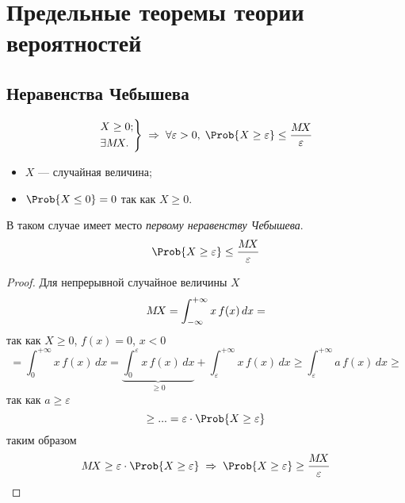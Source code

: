 
\section{Предельные теоремы теории вероятностей}


\subsection{Неравенства Чебышева}

\begin{thm}
	\[
		\left. \begin{aligned}
			&X \geq 0;\\
			&\exists \mx.
		\end{aligned} \right\} \Rarrow \forall \varepsilon > 0,\; \Prob \{ X \geq \varepsilon \} \leq \frac{\mx}{\varepsilon}
	\]
	\begin{itemize}
		\item $X$ --- случайная величина;
		\item $\Prob \{ X \leq 0 \} = 0$ так как $X \geq 0$.
	\end{itemize}
	В таком случае имеет место \emph{первому неравенству Чебышева}.
	\begin{equation}
		\Prob \{ X \geq \varepsilon \} \leq \frac{\mx}{\varepsilon}
	\end{equation}
\end{thm}

\begin{proof}
	Для непрерывной случайное величины $X$
	\[
		M\!X = \int_{-\infty}^{+\infty} x\, f(x)\, dx =
	\]
	так как $X \geq 0$, $f(x) = 0$, $x < 0$
	\[
		= \int_{0}^{+\infty} x\, f(x)\, dx = \underbrace{\int_{0}^{\varepsilon} x\, f(x)\, dx}_{\geq 0} + \int_{\varepsilon}^{+\infty} x\, f(x)\, dx \geq \int_{\varepsilon}^{+\infty} a\, f(x)\, dx \geq
	\]
	так как $a \geq \varepsilon$
	\[
		\geq ... = \varepsilon \cdot \Prob \{ X \geq \varepsilon \}
	\]
	таким образом
	\[
		\mx \geq \varepsilon \cdot \Prob \{ X \geq \varepsilon \} \;\Rightarrow\; \Prob \{ X \geq \varepsilon \} \geq \frac{\mx}{\varepsilon}
	\]
	
\end{proof}